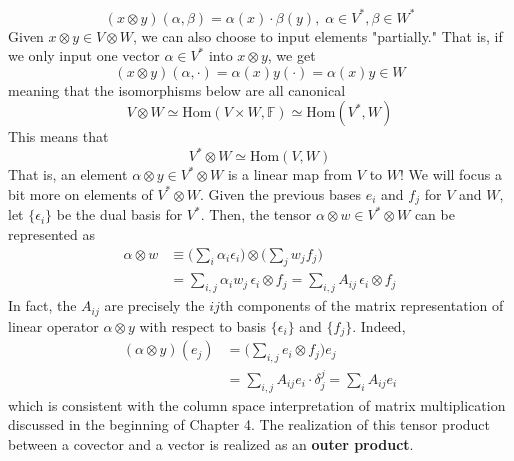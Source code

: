   \[(x \otimes y) (\alpha, \beta) = \alpha (x) \cdot \beta (y), \; \alpha \in V^*, \beta \in W^*\]
  Given $x \otimes y \in V \otimes W$, we can also choose to input elements "partially." That is, if we only input one vector $\alpha \in V^*$ into $x \otimes y$, we get
  \[(x \otimes y) (\alpha, \cdot) = \alpha(x) y (\cdot) = \alpha (x) y \in W\]
  meaning that the isomorphisms below are all canonical 
  \begin{equation}
    V \otimes W \simeq \text{Hom}(V \times W, \mathbb{F}) \simeq \text{Hom}(V^*, W)  \label{linmaps_are_tensors}
  \end{equation}
  This means that
  \[V^* \otimes W \simeq \text{Hom}(V, W)\]
  That is, an element $\alpha \otimes y \in V^* \otimes W$ is a linear map from $V$ to $W$! We will focus a bit more on elements of $V^* \otimes W$. Given the previous bases $e_i$ and $f_j$ for $V$ and $W$, let $\{\epsilon_i\}$ be the dual basis for $V^*$. Then, the tensor $\alpha \otimes w \in V^* \otimes W$ can be represented as 
  \begin{align*}
      \alpha \otimes w & \equiv \bigg(\sum_i \alpha_i \epsilon_i \bigg) \otimes \bigg( \sum_j w_j f_j \bigg) \\
      & = \sum_{i, j} \alpha_i w_j \, \epsilon_i \otimes f_j = \sum_{i, j} A_{i j} \, \epsilon_i \otimes f_j
  \end{align*}
  In fact, the $A_{i j}$ are precisely the $i j$th components of the matrix representation of linear operator $\alpha \otimes y$ with respect to basis $\{\epsilon_i\}$ and $\{f_j\}$. Indeed,
  \begin{align*}
      (\alpha \otimes y)(e_j) & = \bigg( \sum_{i, j} e_i \otimes f_j \bigg) e_j \\
      & = \sum_{i, j} A_{i j} e_i \cdot \delta^j_j = \sum_{i} A_{i j} e_i
  \end{align*}
  which is consistent with the column space interpretation of matrix multiplication discussed in the beginning of Chapter 4. The realization of this tensor product between a covector and a vector is realized as an \textbf{outer product}. 

